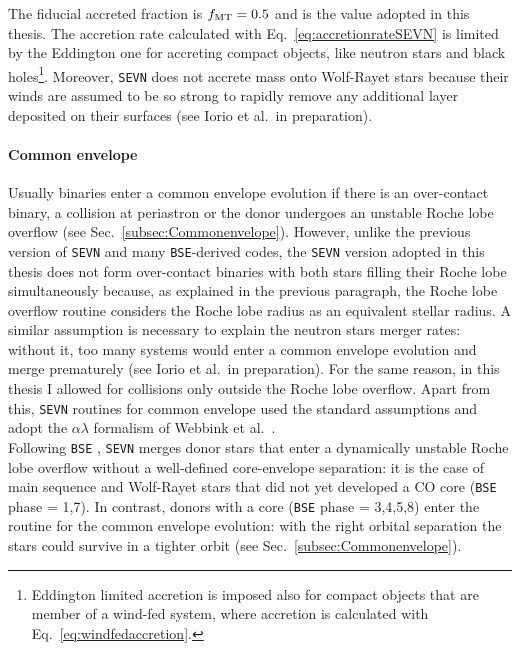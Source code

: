 \documentclass[a4paper,titlepage]{book}     	%
\begin{document}
The fiducial accreted fraction is $f_{\rm MT} = 0.5$ and is the value adopted in this thesis. The accretion rate calculated with Eq.\ \ref{eq:accretionrateSEVN} is limited by the Eddington one for accreting compact objects, like neutron stars and black holes\footnote{Eddington limited accretion is imposed also for compact objects that are member of a wind-fed system, where accretion is calculated with Eq.\ \ref{eq:windfedaccretion}.}. Moreover, \texttt{SEVN} does not accrete mass onto Wolf-Rayet stars because their winds are assumed to be so strong to rapidly remove any additional layer deposited on their surfaces (see Iorio et al.\ in preparation).




\paragraph{Common envelope} Usually binaries enter a common envelope evolution if there is an over-contact binary, a collision at periastron or the donor undergoes an unstable Roche lobe overflow (see Sec.\ \ref{subsec:Commonenvelope}). However, unlike the previous version of \texttt{SEVN} \cite{spera2019_mergingBBH} and many \texttt{BSE}-derived codes, the \texttt{SEVN} version adopted in this thesis does not form over-contact binaries with both stars filling their Roche lobe simultaneously because, as explained in the previous paragraph, the Roche lobe overflow routine considers the Roche lobe radius as an equivalent stellar radius. A similar assumption is necessary to explain the neutron stars merger rates: without it, too many systems would enter a common envelope evolution and merge prematurely (see Iorio et al.\ in preparation). For the same reason, in this thesis I allowed for collisions only outside the Roche lobe overflow. Apart from this, \texttt{SEVN} routines for common envelope used the standard assumptions and adopt the $\alpha \lambda$ formalism of Webbink et al.\ \cite{Webbink1984_CE}. \\

Following \texttt{BSE} \cite{Hurley2002}, \texttt{SEVN} merges donor stars that enter a dynamically unstable Roche lobe overflow without a well-defined core-envelope separation: it is the case of main sequence and Wolf-Rayet stars that did not yet developed a CO core (\texttt{BSE} phase = 1,7). In contrast, donors with a core (\texttt{BSE} phase = 3,4,5,8) enter the routine for the common envelope evolution: with the right orbital separation the stars could survive in a tighter orbit (see Sec.\ \ref{subsec:Commonenvelope}).
\end{document}
